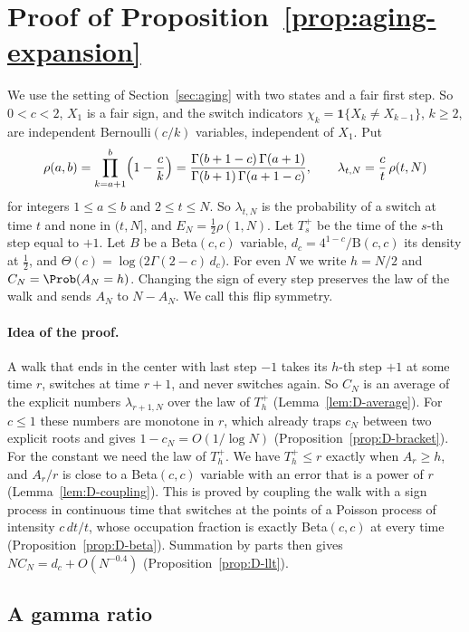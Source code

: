 \section{Proof of Proposition~\ref{prop:aging-expansion}}\label{app:aging}

We use the setting of Section~\ref{sec:aging} with two states and a fair first
step. So $0<c<2$, $X_1$ is a fair sign, and the switch indicators
$\chi_k=\mathbf 1\{X_k\ne X_{k-1}\}$, $k\ge2$, are independent
Bernoulli$(c/k)$ variables, independent of $X_1$. Put
\[
\rho(a,b)=\prod_{k=a+1}^{b}\Bigl(1-\frac ck\Bigr)
=\frac{\Gamma(b+1-c)\,\Gamma(a+1)}{\Gamma(b+1)\,\Gamma(a+1-c)},\qquad
\lambda_{t,N}=\frac ct\,\rho(t,N)
\]
for integers $1\le a\le b$ and $2\le t\le N$. So $\lambda_{t,N}$ is the
probability of a switch at time $t$ and none in $(t,N]$, and
$E_N=\frac12\rho(1,N)$. Let $T^+_s$ be the time of the $s$-th step equal to
$+1$. Let $B$ be a Beta$(c,c)$ variable, $d_c=4^{1-c}/\mathrm B(c,c)$ its
density at $\frac12$, and $\Theta(c)=\log\bigl(2\Gamma(2-c)\,d_c\bigr)$. For
even $N$ we write $h=N/2$ and $C_N=\Prob(A_N=h)$. Changing the sign of every
step preserves the law of the walk and sends $A_N$ to $N-A_N$. We call this
flip symmetry.

\paragraph{Idea of the proof.}
A walk that ends in the center with last step $-1$ takes its $h$-th step
$+1$ at some time $r$, switches at time $r+1$, and never switches again. So
$C_N$ is an average of the explicit numbers $\lambda_{r+1,N}$ over the law of
$T^+_h$ (Lemma~\ref{lem:D-average}). For $c\le1$ these numbers are monotone in
$r$, which already traps $c_N$ between two explicit roots and gives
$1-c_N=O(1/\log N)$ (Proposition~\ref{prop:D-bracket}). For the constant we
need the law of $T^+_h$. We have $T^+_h\le r$ exactly when $A_r\ge h$, and
$A_r/r$ is close to a Beta$(c,c)$ variable with an error that is a power of
$r$ (Lemma~\ref{lem:D-coupling}). This is proved by coupling the walk with a
sign process in continuous time that switches at the points of a Poisson
process of intensity $c\,dt/t$, whose occupation fraction is exactly
Beta$(c,c)$ at every time (Proposition~\ref{prop:D-beta}). Summation by parts
then gives $NC_N=d_c+O(N^{-0.4})$ (Proposition~\ref{prop:D-llt}).

\subsection{A gamma ratio}

